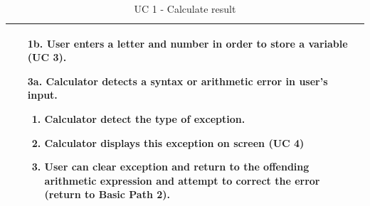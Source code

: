 \documentclass[a4paper, 12pt]{article}
\begin{document}
\begin{table}[!h]
\begin{tabular}{|p{3cm}|p{9cm}|}
\begin{itemize}[leftmargin=6mm]
		\item [1b.] User enters a letter and number in order to store a variable (UC 3).
		\item [3a.] Calculator detects a syntax or arithmetic error in user's input.
			\begin{enumerate}
				\item Calculator detect the type of exception.
				\item Calculator displays this exception on screen (UC 4)
				\item User can clear exception and return to the offending arithmetic expression and attempt to correct the error (return to Basic Path 2).
			\end{enumerate}
		
		\vspace{-3.5mm}
	\end{itemize}  \\ \hline
\end{tabular}
\caption{UC 1 - Calculate result}
\end{table}
\pagebreak
\end{document}
